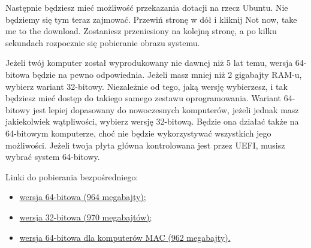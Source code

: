 Następnie będziesz mieć możliwość przekazania dotacji na rzecz Ubuntu. Nie będziemy się tym teraz zajmować. Przewiń stronę w dół i kliknij \textcolor{ubuntu_orange}{Not now, take me to the download}. Zostaniesz przeniesiony na kolejną stronę, a po kilku sekundach rozpocznie się pobieranie obrazu systemu.

Jeżeli twój komputer został wyprodukowany nie dawnej niż 5 lat temu, wersja 64-bitowa będzie na pewno odpowiednia. Jeżeli masz mniej niż 2 gigabajty RAM-u, wybierz wariant 32-bitowy. Niezależnie od tego, jaką wersję wybierzesz, i tak będziesz mieć dostęp do takiego samego zestawu oprogramowania. Wariant 64-bitowy jest lepiej dopasowany do nowoczesnych komputerów, jeżeli jednak masz jakiekolwiek wątpliwości, wybierz wersję 32-bitową. Będzie ona działać także na 64-bitowym komputerze, choć nie będzie wykorzystywać wszystkich jego możliwości. Jeżeli twoja płyta główna kontrolowana jest przez UEFI, musisz wybrać system 64-bitowy.

Linki do pobierania bezpośredniego:
\begin{itemize}
\item \href{http://releases.ubuntu.com/14.04/ubuntu-14.04-desktop-amd64.iso}{wersja 64-bitowa (964 megabajty);}
\item \href{http://releases.ubuntu.com/14.04/ubuntu-14.04-desktop-i386.iso}{wersja 32-bitowa (970 megabajtów);}
\item \href{http://releases.ubuntu.com/14.04/ubuntu-14.04-desktop-amd64+mac.iso}{wersja 64-bitowa dla komputerów MAC (962  megabajty).}
\end{itemize}
